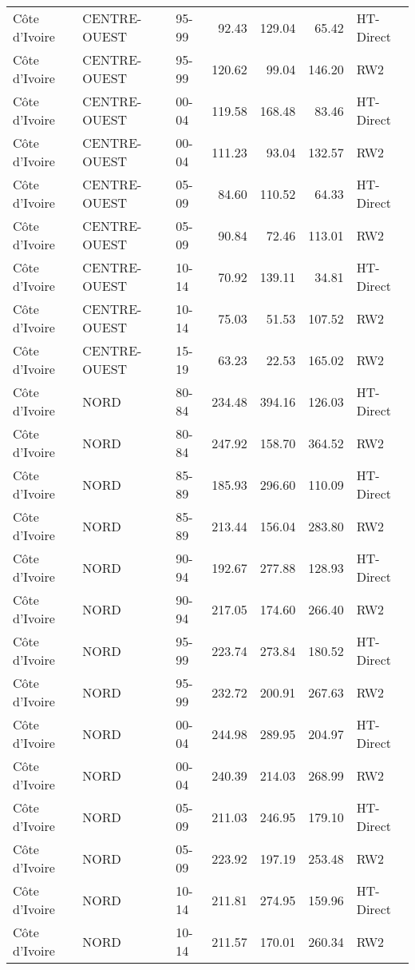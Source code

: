 \begin{longtable}{lllrrrl}
  C\^{o}te d'Ivoire & CENTRE-OUEST & 95-99 & 92.43 & 129.04 & 65.42 & HT-Direct \\ 
  C\^{o}te d'Ivoire & CENTRE-OUEST & 95-99 & 120.62 & 99.04 & 146.20 & RW2 \\ 
  C\^{o}te d'Ivoire & CENTRE-OUEST & 00-04 & 119.58 & 168.48 & 83.46 & HT-Direct \\ 
  C\^{o}te d'Ivoire & CENTRE-OUEST & 00-04 & 111.23 & 93.04 & 132.57 & RW2 \\ 
  C\^{o}te d'Ivoire & CENTRE-OUEST & 05-09 & 84.60 & 110.52 & 64.33 & HT-Direct \\ 
  C\^{o}te d'Ivoire & CENTRE-OUEST & 05-09 & 90.84 & 72.46 & 113.01 & RW2 \\ 
  C\^{o}te d'Ivoire & CENTRE-OUEST & 10-14 & 70.92 & 139.11 & 34.81 & HT-Direct \\ 
  C\^{o}te d'Ivoire & CENTRE-OUEST & 10-14 & 75.03 & 51.53 & 107.52 & RW2 \\ 
  C\^{o}te d'Ivoire & CENTRE-OUEST & 15-19 & 63.23 & 22.53 & 165.02 & RW2 \\ 
  C\^{o}te d'Ivoire & NORD & 80-84 & 234.48 & 394.16 & 126.03 & HT-Direct \\ 
  C\^{o}te d'Ivoire & NORD & 80-84 & 247.92 & 158.70 & 364.52 & RW2 \\ 
  C\^{o}te d'Ivoire & NORD & 85-89 & 185.93 & 296.60 & 110.09 & HT-Direct \\ 
  C\^{o}te d'Ivoire & NORD & 85-89 & 213.44 & 156.04 & 283.80 & RW2 \\ 
  C\^{o}te d'Ivoire & NORD & 90-94 & 192.67 & 277.88 & 128.93 & HT-Direct \\ 
  C\^{o}te d'Ivoire & NORD & 90-94 & 217.05 & 174.60 & 266.40 & RW2 \\ 
  C\^{o}te d'Ivoire & NORD & 95-99 & 223.74 & 273.84 & 180.52 & HT-Direct \\ 
  C\^{o}te d'Ivoire & NORD & 95-99 & 232.72 & 200.91 & 267.63 & RW2 \\ 
  C\^{o}te d'Ivoire & NORD & 00-04 & 244.98 & 289.95 & 204.97 & HT-Direct \\ 
  C\^{o}te d'Ivoire & NORD & 00-04 & 240.39 & 214.03 & 268.99 & RW2 \\ 
  C\^{o}te d'Ivoire & NORD & 05-09 & 211.03 & 246.95 & 179.10 & HT-Direct \\ 
  C\^{o}te d'Ivoire & NORD & 05-09 & 223.92 & 197.19 & 253.48 & RW2 \\ 
  C\^{o}te d'Ivoire & NORD & 10-14 & 211.81 & 274.95 & 159.96 & HT-Direct \\ 
  C\^{o}te d'Ivoire & NORD & 10-14 & 211.57 & 170.01 & 260.34 & RW2 \\ 

\end{longtable}
